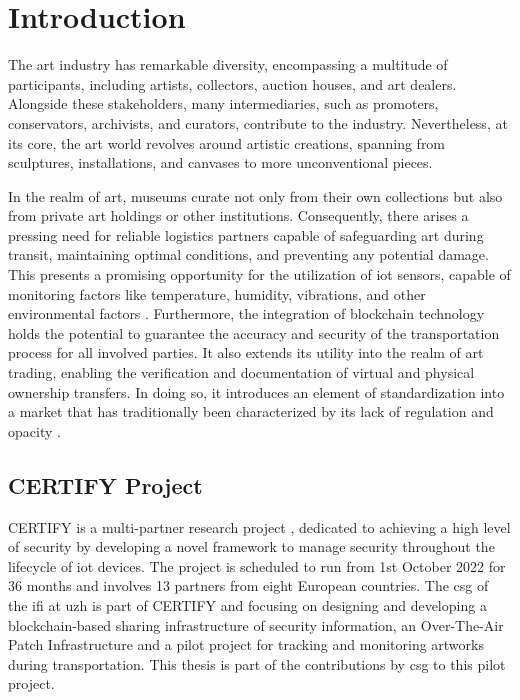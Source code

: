 \chapter{Introduction}
\label{chap:introduction}
The art industry has remarkable diversity, encompassing a multitude of participants, including artists, collectors, auction houses, and art dealers. Alongside these stakeholders, many intermediaries, such as promoters, conservators, archivists, and curators, contribute to the industry. Nevertheless, at its core, the art world revolves around artistic creations, spanning from sculptures, installations, and canvases to more unconventional pieces.

In the realm of art, museums curate not only from their own collections but also from private art holdings or other institutions. Consequently, there arises a pressing need for reliable logistics partners capable of safeguarding art during transit, maintaining optimal conditions, and preventing any potential damage. This presents a promising opportunity for the utilization of \gls{iot} sensors, capable of monitoring factors like temperature, humidity, vibrations, and other environmental factors  \cite{certifydeliverable}. Furthermore, the integration of blockchain technology holds the potential to guarantee the accuracy and security of the transportation process for all involved parties. It also extends its utility into the realm of art trading, enabling the verification and documentation of virtual and physical ownership transfers. In doing so, it introduces an element of standardization into a market that has traditionally been characterized by its lack of regulation and opacity \cite{certifydeliverable}.


\section{CERTIFY Project}
\label{sec:certify}
CERTIFY is a multi-partner research project \cite{certify}, dedicated to achieving a high level of security by developing a novel framework to manage security throughout the lifecycle of \gls{iot} devices. The project is scheduled to run from 1st October 2022 for 36 months and involves 13 partners from eight European countries. The \gls{csg} of the \gls{ifi} at \gls{uzh} is part of CERTIFY and focusing on designing and developing a blockchain-based sharing infrastructure of security information, an Over-The-Air Patch Infrastructure and a pilot project for tracking and monitoring artworks during transportation. This thesis is part of the contributions by \gls{csg} to this pilot project.

